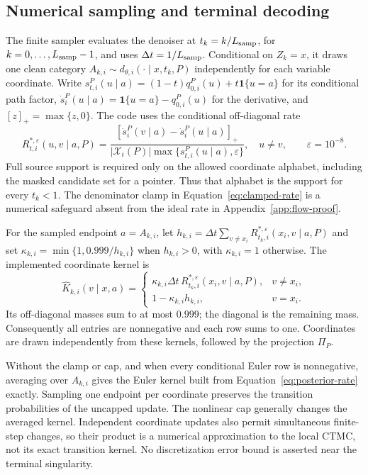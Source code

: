\documentclass{article}
\theoremstyle{definition}
\begin{document}
\subsection{Numerical sampling and terminal decoding}
\label{app:sampling}

The finite sampler evaluates the denoiser at $t_k=k/L_{\rm samp}$, for
$k=0,\ldots,L_{\rm samp}-1$, and uses $\Delta t=1/L_{\rm samp}$.
Conditional on $Z_k=x$, it draws one clean category
$A_{k,i}\sim d_{\theta,i}(\cdot\mid x,t_k,P)$ independently for each variable coordinate.
Write $s_{t,i}^P(u\mid a)=(1-t)q_{0,i}^P(u)+t\mathbf1\{u=a\}$ for its conditional path factor,
$\dot s_i^P(u\mid a)=\mathbf1\{u=a\}-q_{0,i}^P(u)$ for the derivative, and
$[z]_+=\max\{z,0\}$. The code uses the conditional off-diagonal rate
\begin{equation}
 R_{t,i}^{*,\varepsilon}(u,v\mid a,P)
 =\frac{[\dot s_i^P(v\mid a)-\dot s_i^P(u\mid a)]_+}
 {|\mathcal X_i(P)|\max\{s_{t,i}^P(u\mid a),\varepsilon\}},
 \quad u\neq v,\qquad \varepsilon=10^{-8}.
 \label{eq:clamped-rate}
\end{equation}
Full source support is required only on the allowed coordinate alphabet, including the masked
candidate set for a pointer. Thus that alphabet is the support for every $t_k<1$.
The denominator clamp in Equation~\ref{eq:clamped-rate} is a numerical safeguard absent from the
ideal rate in Appendix~\ref{app:flow-proof}.

For the sampled endpoint $a=A_{k,i}$, let
$h_{k,i}=\Delta t\sum_{v\neq x_i}R_{t_k,i}^{*,\varepsilon}(x_i,v\mid a,P)$ and set
$\kappa_{k,i}=\min\{1,0.999/h_{k,i}\}$ when $h_{k,i}>0$, with $\kappa_{k,i}=1$ otherwise.
The implemented coordinate kernel is
\begin{equation}
 \widehat K_{k,i}(v\mid x,a)=
 \begin{cases}
 \kappa_{k,i}\Delta t\,R_{t_k,i}^{*,\varepsilon}(x_i,v\mid a,P),&v\neq x_i,\\
 1-\kappa_{k,i}h_{k,i},&v=x_i.
 \end{cases}
 \label{eq:capped-kernel}
\end{equation}
Its off-diagonal masses sum to at most $0.999$; the diagonal is the remaining mass. Consequently
all entries are nonnegative and each row sums to one. Coordinates are drawn independently from
these kernels, followed by the projection $\Pi_P$.

Without the clamp or cap, and when every conditional Euler row is nonnegative, averaging over
$A_{k,i}$ gives the Euler kernel built from Equation~\ref{eq:posterior-rate} exactly. Sampling one endpoint per coordinate  preserves the transition probabilities of the uncapped update. The nonlinear
cap generally changes the averaged kernel. Independent coordinate updates also permit simultaneous
finite-step changes, so their product is a numerical approximation to the local CTMC, not its exact
transition kernel. No discretization error bound is asserted near the terminal singularity.
\end{document}
